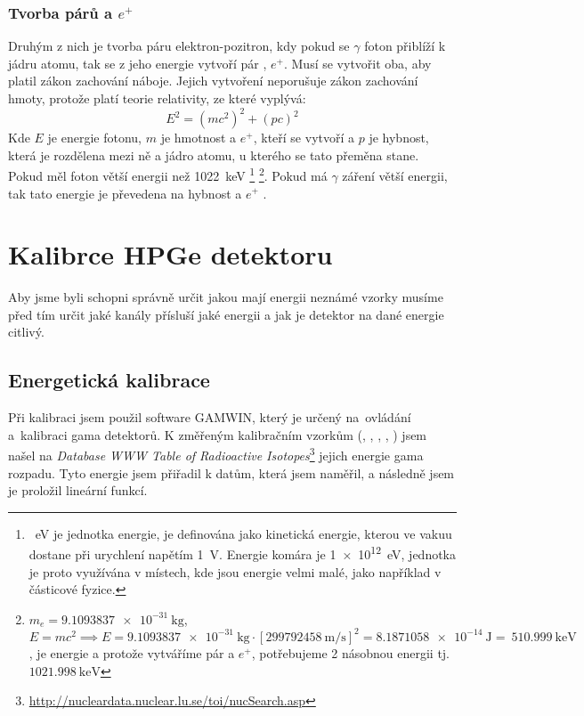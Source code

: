\subsubsection{Tvorba párů \e a $e^+$}
Druhým z nich je tvorba páru elektron-pozitron, kdy pokud se $\gamma$ foton přiblíží k jádru atomu, tak se z jeho energie vytvoří pár \e, $e^+$. Musí se vytvořit oba, aby platil zákon zachování náboje. Jejich vytvoření neporušuje zákon zachování hmoty, protože platí teorie relativity, \break ze které vyplývá:  
\begin{equation}
	E^2 = (mc^2)^2 + (pc)^2
\end{equation}
Kde $E$ je energie fotonu, $m$ je hmotnost \e a $e^+$, kteří se vytvoří a $p$ je hybnost, která je rozdělena mezi ně a jádro atomu, u kterého se tato přeměna stane. 
Pokud měl foton větší energii než \SI{1022}{\kilo\electronvolt} \footnote{\SI{}{\electronvolt} je jednotka energie, je definována jako kinetická energie, kterou ve vakuu \e dostane  při urychlení napětím \SI{1}{\volt}. Energie komára je \SI{1e12}{\electronvolt}, jednotka je proto využívána v místech, kde jsou energie velmi malé, jako například v částicové fyzice.} \footnote{$m_{e} = \SI{9.1093837e-31}{\kilogram}$, $E=mc^2 \implies E = \SI{9.1093837e-31}{\kilogram} \cdot [\SI{299792458}{\meter\per\second}]^2 = \SI{8.1871058e-14}{\joule} =~\SI{510.999}{\kilo\electronvolt}$, je energie \e a protože vytváříme pár \e a $e^+$, potřebujeme 2 násobnou energii tj.~$\SI{1021.998}{\kilo\electronvolt}$}.\enlargethispage{\baselineskip} Pokud má $\gamma$ záření větší energii, tak tato energie je převedena na hybnost \e a $e^+$ \cite{semiconductors,libretext_pair}. %
\section{Kalibrce HPGe detektoru}
Aby jsme byli schopni správně určit jakou mají energii neznámé vzorky musíme před tím určit jaké kanály přísluší jaké energii a jak je detektor na dané energie citlivý.
\subsection{Energetická kalibrace}%
Při kalibraci jsem použil software GAMWIN, který je určený na~ovládání a~kalibraci gama detektorů. K změřeným kalibračním vzorkům (, , , , ) jsem našel na \textit{Database WWW Table of Radioactive Isotopes}\footnote{\url{http://nucleardata.nuclear.lu.se/toi/nucSearch.asp}}
jejich energie gama rozpadu. Tyto energie jsem přiřadil k datům, která jsem naměřil, a následně jsem je proložil lineární funkcí. \cite{VUT} 

